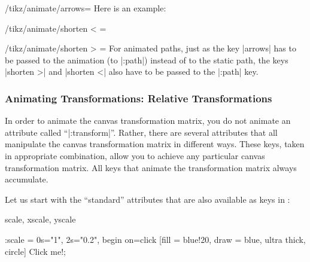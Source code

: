 \begin{key}{/tikz/animate/arrows=}
    Here is an example:
\begin{codeexample}[
    preamble={\usetikzlibrary{animations}},
    animation list={0.5,1,1.5,2},
    animation bb={(-0.1,-0.1) rectangle (1.1,1.1)},
]
\end{codeexample}
\end{key}

\begin{key}{/tikz/animate/shorten < = }
\end{key}

\begin{key}{/tikz/animate/shorten > = }
    For animated paths, just as the key |arrows| has to be passed to the
    animation (to |:path|) instead of to the static path, the keys |shorten >|
    and |shorten <| also have to be passed to the |:path| key.
\end{key}


\subsubsection{Animating Transformations: Relative Transformations}

In order to animate the canvas transformation matrix, you do not animate an
attribute called ``|:transform|''. Rather, there are several attributes that
all manipulate the canvas transformation matrix in different ways. These keys,
taken in appropriate combination, allow you to achieve any particular canvas
transformation matrix. All keys that animate the transformation matrix always
accumulate.

Let us start with the ``standard'' attributes that are also available as keys
in \tikzname:

\begin{tikzanimateattribute}{scale, xscale, yscale}
\begin{codeexample}[
    preamble={\usetikzlibrary{animations}},
    animation list={0.5,1,1.5,2},
]
\tikz \node :scale = { 0s="1", 2s="0.2", begin on=click}
  [fill = blue!20, draw = blue, ultra thick, circle] {Click me!};
\end{codeexample}
\end{tikzanimateattribute}

